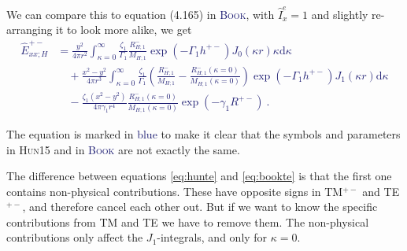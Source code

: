 \documentclass[fontsize=9pt, parskip=half, notitlepage, fleqn]{scrartcl}
\newcommand{\bkcol}[1]{\textcolor{MidnightBlue}{#1\xspace}}
\newcommand{\hun}{\textsc{Hun15}\xspace}
\newcommand{\book}{\bkcol{\textsc{Book}}\xspace}
\newcommand{\mr}[1]{\mathrm{#1}}
\begin{document}
We can compare this to equation (4.165) in \book, with $\hat{I}^e_x=1$ and
slightly re-arranging it to look more alike, we get
%
\bkcol{
\begin{align}
  \hat{E}^{+-}_{xx;H} &= \frac{y^2}{4\pi r^2}
  \int^\infty_{\kappa=0} \frac{\zeta_1}{\Gamma_1} 
  \frac{R^-_{H;1}}{M_{H;1}}
  \exp(-\Gamma_1 h^{+-})J_0(\kappa r)\kappa\mr{d}\kappa \nonumber \\
  &\quad + \frac{x^2-y^2}{4\pi r^3}
  \int^\infty_{\kappa=0} \frac{\zeta_1}{\Gamma_1} 
  \left(\frac{R^-_{H;1}}{M_{H;1}} -
  \frac{R^-_{H;1}(\kappa=0)}{M_{H;1}(\kappa=0)}\right)
  \exp(-\Gamma_1 h^{+-})J_1(\kappa r)\mr{d}\kappa \nonumber \\
  &\quad - \frac{\zeta_1 (x^2-y^2)}{4\pi\gamma_1 r^4}
  \frac{R^-_{H;1}(\kappa=0)}{M_{H;1}(\kappa=0)}
  \exp(-\gamma_1 R^{+-}) \ .
  \label{eq:bookte}
\end{align}
}

The equation is marked in \bkcol{blue} to make it clear that the symbols and
parameters in \hun and in \book are not exactly the same.

The difference between equations \ref{eq:hunte} and \ref{eq:bookte} is that the
first one contains non-physical contributions. These have opposite signs in
TM$^{+-}$ and TE$^{+-}$, and therefore cancel each other out. But if we want to
know the specific contributions from TM and TE we have to remove them. The
non-physical contributions only affect the $J_1$-integrals, and only for
$\kappa = 0$.
\end{document}

